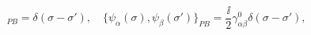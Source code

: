 \begin{equation}
  [\Pi(\sigma),X(\sigma')]_{PB}=\delta(\sigma-\sigma'),\quad
  \{\psi_\alpha(\sigma),\psi_\beta(\sigma')\}_{PB}=
  \frac{\ii}{2} \gamma^0_{\alpha\beta}\delta(\sigma-\sigma') ,
\end{equation}

